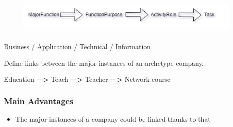 \documentclass[12pt]{report}
\begin{document}
\begin{figure}[H]
	\begin{Center}
		\includegraphics[width=5.25in,height=0.67in]{./media/image9.png}
	\end{Center}
\end{figure}



\begin{Center}
Business / Application / Technical / Information


Define links between the major instances of an archetype company. \par

 Education \textbf{=>} Teach \textbf{=>} Teacher \textbf{=> }Network course \par
\end{Center}

\subsubsection*{Main Advantages }
\begin{itemize}
	\item The major instances of a company could be linked thanks to that \par
\end{itemize}
\end{document}
